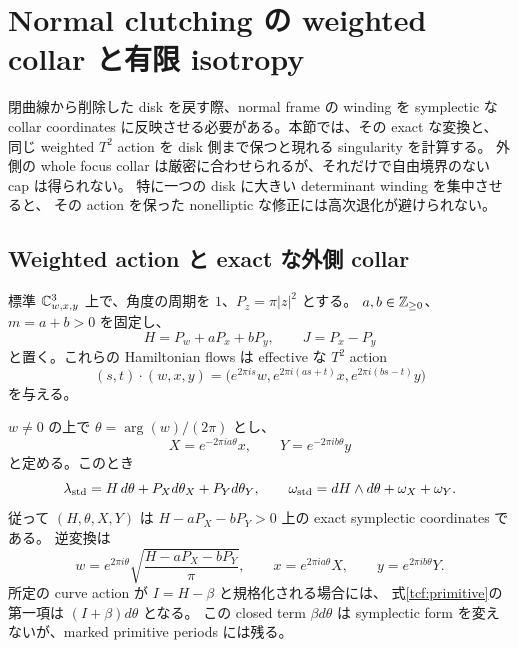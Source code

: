 \section{Normal clutching の weighted collar と有限 isotropy}
\label{tcf:section}

閉曲線から削除した disk を戻す際、normal frame の winding を symplectic な
collar coordinates に反映させる必要がある。本節では、その exact な変換と、
同じ weighted $T^2$ action を disk 側まで保つと現れる singularity を計算する。
外側の whole focus collar は厳密に合わせられるが、それだけで自由境界のない cap は得られない。
特に一つの disk に大きい determinant winding を集中させると、
その action を保った nonelliptic な修正には高次退化が避けられない。

\subsection{Weighted action と exact な外側 collar}

標準 $\mathbb C^3_{w,x,y}$ 上で、角度の周期を $1$、$P_z=\pi|z|^2$ とする。
$a,b\in\mathbb Z_{\ge0}$、$m=a+b>0$ を固定し、
\begin{equation}\label{tcf:actions}
 H=P_w+aP_x+bP_y,\qquad J=P_x-P_y
\end{equation}
と置く。これらの Hamiltonian flows は effective な $T^2$ action
\begin{equation}\label{tcf:torus-action}
 (s,t)\cdot(w,x,y)
 =\bigl(e^{2\pi is}w,e^{2\pi i(as+t)}x,e^{2\pi i(bs-t)}y\bigr)
\end{equation}
を与える。

$w\ne0$ の上で $\theta=\arg(w)/(2\pi)$ とし、
\begin{equation}\label{tcf:collar-coordinates}
 X=e^{-2\pi ia\theta}x,\qquad
 Y=e^{-2\pi ib\theta}y
\end{equation}
と定める。このとき
\begin{equation}\label{tcf:primitive}
 \lambda_{\rm std}=H\,d\theta+P_Xd\theta_X+P_Yd\theta_Y,
 \qquad
 \omega_{\rm std}=dH\wedge d\theta+\omega_X+\omega_Y.
\end{equation}
従って $(H,\theta,X,Y)$ は
$H-aP_X-bP_Y>0$ 上の exact symplectic coordinates である。
逆変換は
\[
 w=e^{2\pi i\theta}\sqrt{\frac{H-aP_X-bP_Y}{\pi}},\qquad
 x=e^{2\pi ia\theta}X,\qquad y=e^{2\pi ib\theta}Y.
\]
所定の curve action が $I=H-\beta$ と規格化される場合には、
式\eqref{tcf:primitive}の第一項は $(I+\beta)d\theta$ となる。
この closed term $\beta d\theta$ は symplectic form を変えないが、marked primitive periods には残る。

